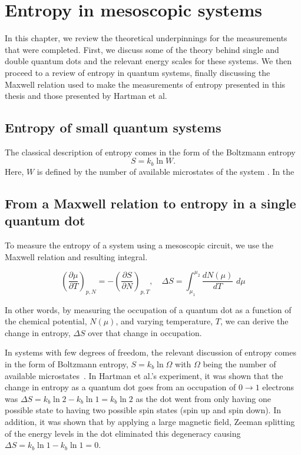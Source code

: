 
\chapter{Entropy in mesoscopic systems}
\label{ch:Theory}

In this chapter, we review the theoretical underpinnings for the measurements that were completed. First, we discuss some of the theory behind single and double quantum dots and the relevant energy scales for these systems. We then proceed to a review of entropy in quantum systems, finally discussing the Maxwell relation used to make the measurements of entropy presented in this thesis and those presented by Hartman et al.

\section{Entropy of small quantum systems}
The classical description of entropy comes in the form of the Boltzmann entropy
\begin{equation}
	S = k_b \ln W.
\end{equation}
Here, $W$ is defined by the number of available microstates of the system \cite{schroeder}. In the 

\section{From a Maxwell relation to entropy in a single quantum dot}
\label{sec:mrtoentropy}

To measure the entropy of a system using a mesoscopic circuit, we use the Maxwell relation and resulting integral.

\begin{equation}
	\label{eqn:MR}
	\left( \frac{\partial \mu }{\partial T} \right)_{p,N} = -\left( \frac{\partial S}{\partial N} \right)_{p,T} , \quad
	\Delta S = \int_{\mu_1}^{\mu_2} \frac{dN(\mu)}{dT}\,\, d\mu
\end{equation}


In other words, by measuring the occupation of a quantum dot as a function of the chemical potential, $N(\mu)$, and varying temperature, $T$, we can derive the change in entropy, $\Delta S$ over that change in occupation.

In systems with few degrees of freedom, the relevant discussion of entropy comes in the form of Boltzmann entropy, $S = k_b \ln \Omega$ with $\Omega$ being the number of available microstates~\cite{schroeder}. In Hartman et al.'s experiment, it was shown that the change in entropy as a quantum dot goes from an occupation of $0 \to 1$ electrons was $\Delta S = k_b \ln 2 - k_b \ln 1 = k_b \ln 2$ as the dot went from only having one possible state to having two possible spin states (spin up and spin down). In addition, it was shown that by applying a large magnetic field, Zeeman splitting of the energy levels in the dot eliminated this degeneracy causing $\Delta S = k_b \ln 1 - k_b \ln 1 = 0$.

